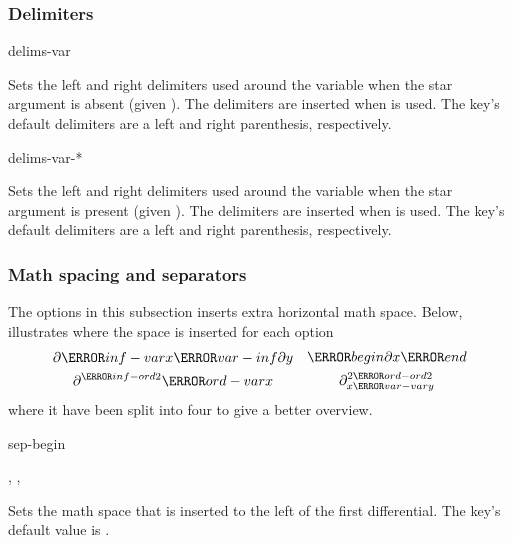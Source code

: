 \subsubsection*{Delimiters}

\begin{option}{delims-var}
	\begin{values}[default = (~)]
	\end{values}
	Sets the left and right delimiters used around the variable when the star argument is absent (given ). The delimiters are inserted when  is used. The key's default delimiters are a left and right parenthesis, respectively.
\end{option}

\begin{option}{delims-var-*}
	\begin{values}[default = (~)]
	\end{values}
	Sets the left and right delimiters used around the variable when the star argument is present (given ). The delimiters are inserted when  is used. The key's default delimiters are a left and right parenthesis, respectively.
\end{option}

\subsubsection*{Math spacing and separators}
The options in this subsection inserts extra horizontal math space. Below, illustrates where the space is inserted for each option
\begin{align*}
	\begin{gathered}
		\partial \ms{inf-var} x \ms{var-inf} \partial y \\
		\partial^{ \ms{inf-ord} 2 } \ms{ord-var} x
	\end{gathered}
	&&
	\begin{gathered}
		\ms{begin} \partial x \ms{end} \\
		\partial^{ 2\ms{ord-ord} 2 }_{ x \ms{var-var} y }
	\end{gathered}
\end{align*}
where it have been split into four to give a better overview.

\begin{option}{sep-begin}
	\begin{values}[default = \cs{mathop}\{\}\cs{!}]
		, , 
	\end{values}
	Sets the math space that is inserted to the left of the first differential. The key's default value is .
\end{option}

